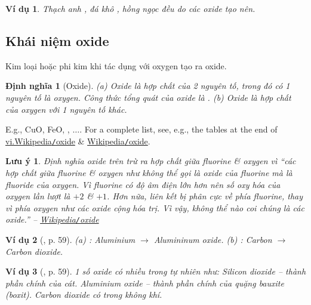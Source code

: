 \documentclass{article}
\newtheorem{dinhnghia}{Định nghĩa}
\newtheorem{luuy}{Lưu ý}
\newtheorem{vidu}{Ví dụ}
\begin{document}
\begin{vidu}
	Thạch anh {\rm{}}, đá khô {\rm{}}, hồng ngọc {\rm{}} đều do các oxide tạo nên.
\end{vidu}

\subsection{Khái niệm oxide}
Kim loại hoặc phi kim khi tác dụng với oxygen tạo ra {\rm oxide}.

\begin{dinhnghia}[Oxide]
	(a) {\rm Oxide} là hợp chất của 2 nguyên tố, trong đó có 1 nguyên tố là oxygen. Công thức tổng quát của oxide là {\rm{}}. (b) {\rm Oxide} là hợp chất của oxygen với 1 nguyên tố khác.
\end{dinhnghia}
E.g., CuO, FeO, , $\ldots$. For a complete list, see, e.g., the tables at the end of \href{https://vi.wikipedia.org/wiki/Oxide}{vi.Wikipedia{\tt/}oxide} \& \href{https://en.wikipedia.org/wiki/Oxide}{Wikipedia{\tt/}oxide}.

\begin{luuy}
	Định nghĩa oxide trên trừ ra hợp chất giữa fluorine \& oxygen vì ``các hợp chất giữa fluorine \& oxygen như {\rm{}} không thể gọi là oxide của fluorine mà là fluoride của oxygen. Vì fluorine có độ âm điện lớn hơn nên số oxy hóa của oxygen lần lượt là $+2$ \& $+1$. Hơn nữa, liên kết {\rm{}} bị phân cực về phía fluorine, thay vì phía oxygen như các oxide cộng hóa trị. Vì vậy, không thể nào coi chúng là các oxide.'' -- \href{https://vi.wikipedia.org/wiki/Oxide}{Wikipedia{\tt/}oxide}
\end{luuy}

\begin{vidu}[\cite{SGK_KHTN_8_Canh_Dieu}, p. 59]
	(a) {\rm{}}: Aluminium $\to$ Alumininum oxide. (b) {\rm{}}: Carbon $\to$ Carbon dioxide.
\end{vidu}

\begin{vidu}[\cite{SGK_KHTN_8_Canh_Dieu}, p. 59]
	1 số oxide có nhiều trong tự nhiên như: Silicon dioxide {\rm{}} -- thành phần chính của cát. Aluminium oxide {\rm{}} -- thành phần chính của quặng bauxite (boxit). Carbon dioxide {\rm{}} có trong không khí.
\end{vidu}
\end{document}
